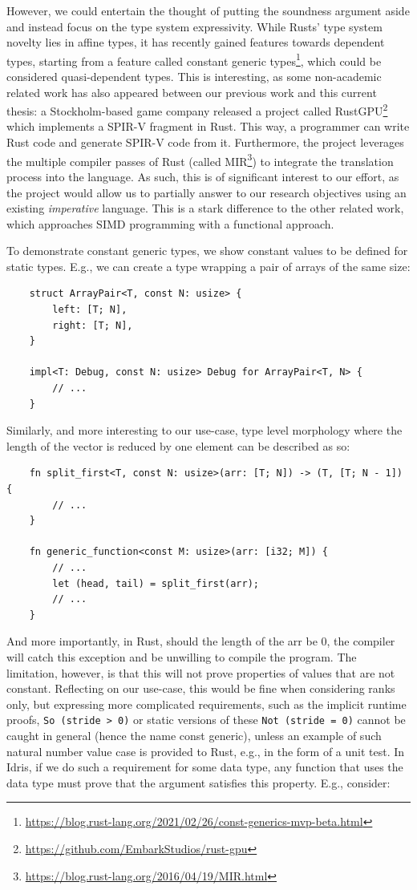 \documentclass{report}
\begin{document}
However, we could entertain the thought of putting the soundness argument aside and instead focus on the type system expressivity. While Rusts' type system novelty lies in affine types, it has recently gained features towards dependent types, starting from a feature called constant generic types\footnote{\url{https://blog.rust-lang.org/2021/02/26/const-generics-mvp-beta.html}}, which could be considered quasi-dependent types. This is interesting, as some non-academic related work has also appeared between our previous work and this current thesis: a Stockholm-based game company released a project called RustGPU\footnote{\url{https://github.com/EmbarkStudios/rust-gpu}} which implements a SPIR-V fragment in Rust. This way, a programmer can write Rust code and generate SPIR-V code from it. Furthermore, the project leverages the multiple compiler passes of Rust (called MIR\footnote{\url{https://blog.rust-lang.org/2016/04/19/MIR.html}}) to integrate the translation process into the language. As such, this is of significant interest to our effort, as the project would allow us to partially answer to our research objectives using an existing \emph{imperative} language. This is a stark difference to the other related work, which approaches SIMD programming with a functional approach.

To demonstrate constant generic types, we show constant values to be defined for static types. E.g., we can create a type wrapping a pair of arrays of the same size:

\begin{verbatim}
    struct ArrayPair<T, const N: usize> {
        left: [T; N],
        right: [T; N],
    }
    
    impl<T: Debug, const N: usize> Debug for ArrayPair<T, N> {
        // ...
    }
\end{verbatim}

Similarly, and more interesting to our use-case, type level morphology where the length of the vector is reduced by one element can be described as so:

\begin{verbatim}
    fn split_first<T, const N: usize>(arr: [T; N]) -> (T, [T; N - 1]) {
        // ...
    }
    
    fn generic_function<const M: usize>(arr: [i32; M]) {
        // ...
        let (head, tail) = split_first(arr);
        // ...
    }
\end{verbatim}

And more importantly, in Rust, should the length of the arr be 0, the compiler will catch this exception and be unwilling to compile the program. The limitation, however, is that this will not prove properties of values that are not constant. Reflecting on our use-case, this would be fine when considering ranks only, but expressing more complicated requirements, such as the implicit runtime proofs, \verb|So (stride > 0)| or static versions of these \verb|Not (stride = 0)| cannot be caught in general (hence the name const generic), unless an example of such natural number value case is provided to Rust, e.g., in the form of a unit test. In Idris, if we do such a requirement for some data type, any function that uses the data type must prove that the argument satisfies this property. E.g., consider:
\end{document}
